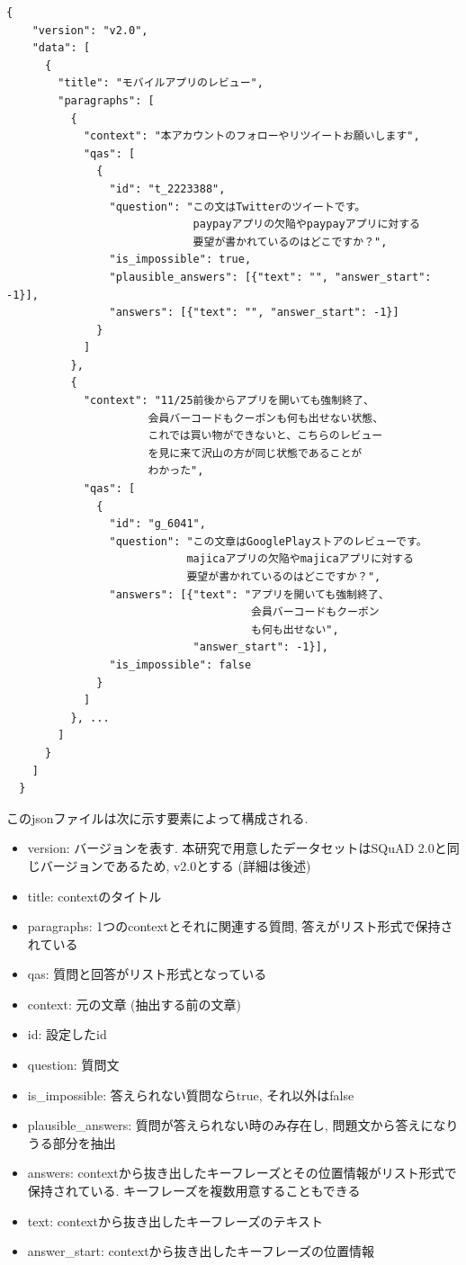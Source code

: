 \begin{lstlisting}[caption=データセット.json,label=json]
  {
    "version": "v2.0", 
    "data": [
      {
        "title": "モバイルアプリのレビュー", 
        "paragraphs": [
          {
            "context": "本アカウントのフォローやリツイートお願いします",
            "qas": [
              {
                "id": "t_2223388",
                "question": "この文はTwitterのツイートです。
                             paypayアプリの欠陥やpaypayアプリに対する
                             要望が書かれているのはどこですか？",
                "is_impossible": true,
                "plausible_answers": [{"text": "", "answer_start": -1}],
                "answers": [{"text": "", "answer_start": -1}]
              }
            ]
          },
          {
            "context": "11/25前後からアプリを開いても強制終了、
                      会員バーコードもクーポンも何も出せない状態、
                      これでは買い物ができないと、こちらのレビュー
                      を見に来て沢山の方が同じ状態であることが
                      わかった",
            "qas": [
              {
                "id": "g_6041", 
                "question": "この文章はGooglePlayストアのレビューです。
                            majicaアプリの欠陥やmajicaアプリに対する
                            要望が書かれているのはどこですか？",
                "answers": [{"text": "アプリを開いても強制終了、
                                      会員バーコードもクーポン
                                      も何も出せない", 
                             "answer_start": -1}], 
                "is_impossible": false
              }
            ]
          }, ...
        ]
      }
    ]
  } 
\end{lstlisting}
\noindent
このjsonファイルは次に示す要素によって構成される. 

\begin{itemize}
  \item version: バージョンを表す. 本研究で用意したデータセットはSQuAD 2.0と同じバージョンであるため, v2.0とする (詳細は後述)
  \item title: contextのタイトル
  \item paragraphs: 1つのcontextとそれに関連する質問, 答えがリスト形式で保持されている
  \item qas: 質問と回答がリスト形式となっている
  \item context: 元の文章 (抽出する前の文章) 
  \item id: 設定したid
  \item question: 質問文
  \item is\_impossible: 答えられない質問ならtrue, それ以外はfalse
  \item plausible\_answers: 質問が答えられない時のみ存在し, 問題文から答えになりうる部分を抽出
  \item answers: contextから抜き出したキーフレーズとその位置情報がリスト形式で保持されている. キーフレーズを複数用意することもできる
  \item text: contextから抜き出したキーフレーズのテキスト
  \item answer\_start: contextから抜き出したキーフレーズの位置情報
\end{itemize}

